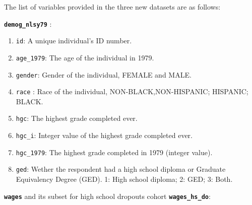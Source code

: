 \documentclass{article}
\providecommand{\tightlist}{%
  \setlength{\itemsep}{0pt}\setlength{\parskip}{0pt}}
\begin{document}
The list of variables provided in the three new datasets are as follows:

\textbf{\texttt{demog\_nlsy79}} :

\begin{enumerate}
\def\labelenumi{\arabic{enumi}.}
\tightlist
\item
  \texttt{id}: A unique individual's ID number.
\item
  \texttt{age\_1979}: The age of the individual in 1979.
\item
  \texttt{gender}: Gender of the individual, FEMALE and MALE.
\item
  \texttt{race} : Race of the individual, NON-BLACK,NON-HISPANIC; HISPANIC; BLACK.
\item
  \texttt{hgc}: The highest grade completed ever.
\item
  \texttt{hgc\_i}: Integer value of the highest grade completed ever.
\item
  \texttt{hgc\_1979}: The highest grade completed in 1979 (integer value).
\item
  \texttt{ged}: Wether the respondent had a high school diploma or Graduate Equivalency Degree (GED). 1: High school diploma; 2: GED; 3: Both.
\end{enumerate}

\textbf{\texttt{wages}} and its subset for high school dropouts cohort \textbf{\texttt{wages\_hs\_do}}:
\end{document}
